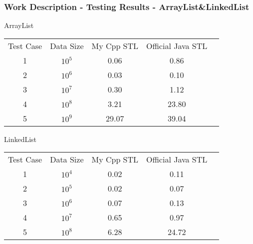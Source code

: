 \documentclass[table, usenames,dvipsnames,svgnames]{beamer}
\begin{document}
\begin{frame}

\frametitle{Work Description - Testing Results - ArrayList\&LinkedList}


\pause
\begin{center}
ArrayList\\
\vspace{2mm}
\begin{tabular}{ccccc}
Test Case&Data Size&My Cpp STL & Official Java STL\\
1&$10^5$&0.06&0.86\\
2&$10^6$&0.03&0.10\\
3&$10^7$&0.30&1.12\\
4&$10^8$&3.21&23.80\\
5&$10^9$&29.07&39.04\\ 
\end{tabular}
\end{center}

\pause
\begin{center}
LinkedList\\
\vspace{2mm}
\begin{tabular}{ccccc}
Test Case&Data Size&My Cpp STL & Official Java STL\\
1&$10^4$&0.02&0.11\\
2&$10^5$&0.02&0.07\\
3&$10^6$&0.07&0.13\\
4&$10^7$&0.65&0.97\\
5&$10^8$&6.28&24.72\\ 
\end{tabular}
\end{center}

\end{frame}
\end{document}
